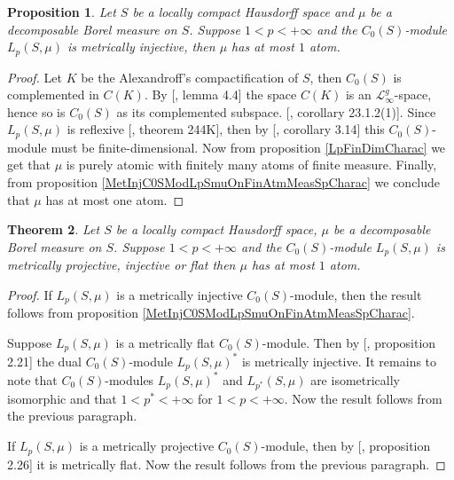 \documentclass[12pt]{article}
\newtheorem{theorem}{Theorem}[section]
\newtheorem{proposition}[theorem]{Proposition}
\begin{document}
\begin{proposition}\label{MetInjC0SModLpSmuCharac}
    Let $S$ be a locally compact Hausdorff space and $\mu$ be a decomposable 
    Borel measure on $S$. Suppose $1<p<+\infty$ and 
    the $C_0(S)$-module $L_p(S,\mu)$ is metrically injective, 
    then $\mu$ has at most $1$ atom.
\end{proposition}
\begin{proof} 
    Let $K$ be the Alexandroff's compactification of $S$, then $C_0(S)$ is 
    complemented in $C(K)$. By [\cite{DefFloTensNorOpId}, lemma 4.4] the space
    $C(K)$ is an $\mathscr{L}_\infty^g$-space, hence so is $C_0(S)$ as its 
    complemented subspace. [\cite{DefFloTensNorOpId}, corollary 23.1.2(1)]. 
    Since $L_p(S,\mu)$ is reflexive [\cite{FremMeasTh2}, theorem 244K], then
    by [\cite{NemGeomProjInjFlatBanMod}, corollary 3.14] this $C_0(S)$-module 
    must be finite-dimensional. Now from proposition \ref{LpFinDimCharac} we 
    get that $\mu$ is purely atomic with finitely many atoms of finite measure.
    Finally, from proposition \ref{MetInjC0SModLpSmuOnFinAtmMeasSpCharac} we 
    conclude that $\mu$ has at most one atom.
\end{proof}

\begin{theorem}\label{MetInjPlotjFlatC0SModLpSmuCharac}
    Let $S$ be a locally compact Hausdorff space, $\mu$ be a decomposable 
    Borel measure on $S$. Suppose $1<p<+\infty$ and 
    the $C_0(S)$-module $L_p(S,\mu)$ is metrically projective, injective or 
    flat then $\mu$ has at most $1$ atom.
\end{theorem}
\begin{proof} 
    If $L_p(S,\mu)$ is a metrically injective $C_0(S)$-module, then the 
    result follows from proposition \ref{MetInjC0SModLpSmuOnFinAtmMeasSpCharac}. 
    
    Suppose $L_p(S,\mu)$ is a metrically flat $C_0(S)$-module. Then by 
    [\cite{NemGeomProjInjFlatBanMod}, proposition 2.21] the 
    dual $C_0(S)$-module $L_p(S,\mu)^*$ is metrically injective. 
    It remains to note that $C_0(S)$-modules $L_p(S,\mu)^*$ and $L_{p^*}(S,\mu)$ 
    are isometrically isomorphic and that $1<p^*<+\infty$ for $1<p<+\infty$. 
    Now the result follows from the previous paragraph.
    
    If $L_p(S,\mu)$ is a metrically projective $C_0(S)$-module, then by
    [\cite{NemGeomProjInjFlatBanMod}, proposition 2.26] it is metrically flat. 
    Now the result follows from the previous paragraph.
\end{proof}
\end{document}
